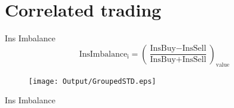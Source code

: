 \documentclass{beamer}
\begin{document}
%	
%	
%	
%	
%	
%	
%	
%	
%	
%	
%	
%	
	\section{Correlated trading}

\begin{frame}{Ins Imbalance}
			 \begin{equation*}
				 \text{InsImbalance}_\text{i} = (\frac{\text{InsBuy} - \text{InsSell}}{\text{InsBuy} + \text{InsSell}})_{\text{value}}
			\end{equation*}
\begin{figure}[htbp]
	\centering
	\texttt{[image: Output/GroupedSTD.eps]}
	\label{fig:GroupedSTD}
\end{figure}
\end{frame}

\begin{frame}{Ins Imbalance}


				\begin{table}[htbp]
			\centering
			\resizebox{1\textwidth}{!}{
				
			}
		\end{table}
	
	\end{frame}
	
\end{document}
